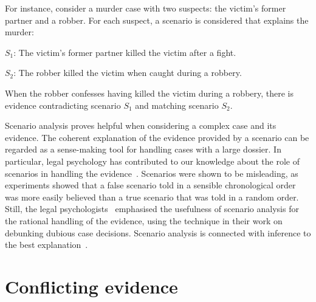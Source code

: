 \documentclass[10pt]{article}
\begin{document}
For instance, consider a murder case with two suspects: the victim's former partner and a robber. For each suspect, a scenario is considered that explains the murder:

\begin{description}
	\item $S_1$: The victim's former partner killed the victim after a fight.
	\item $S_2$: The robber killed the victim when caught during a robbery.	
\end{description}

\noindent When the robber confesses having killed the victim during a robbery, there is evidence contradicting scenario $S_1$ and matching scenario $S_2$.

Scenario analysis proves helpful when considering a complex case and its evidence. The coherent explanation of the evidence provided by a scenario can be regarded as a sense-making tool for handling cases with a large dossier. In particular, legal psychology has contributed to our knowledge about the role of scenarios in handling the evidence~\citep{bennettFeldman1981,penningtonHastie1993}. Scenarios were shown to be misleading, as experiments showed that a false scenario told in a sensible chronological order was more easily believed than a true scenario that was told in a random order. Still, the legal psychologists~\citet{wagenaarEtal1993} emphasised the usefulness of scenario analysis for the rational handling of the evidence, using the technique in their work on debunking dubious case decisions. Scenario analysis is connected with inference to the best explanation~\citep{pardoAllen2008}.




\section{Conflicting evidence}
\label{sec:conf}
 	
\end{document}
